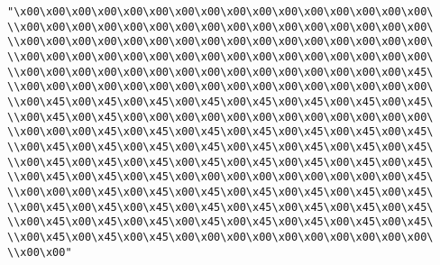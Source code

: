 \verb|"\x00\x00\x00\x00\x00\x00\x00\x00\x00\x00\x00\x00\x00\x00\x00\x00\|\newline
\verb|\\x00\x00\x00\x00\x00\x00\x00\x00\x00\x00\x00\x00\x00\x00\x00\x00\|\newline
\verb|\\x00\x00\x00\x00\x00\x00\x00\x00\x00\x00\x00\x00\x00\x00\x00\x00\|\newline
\verb|\\x00\x00\x00\x00\x00\x00\x00\x00\x00\x00\x00\x00\x00\x00\x00\x00\|\newline
\verb|\\x00\x00\x00\x00\x00\x00\x00\x00\x00\x00\x00\x00\x00\x00\x00\x45\|\newline
\verb|\\x00\x00\x00\x00\x00\x00\x00\x00\x00\x00\x00\x00\x00\x00\x00\x00\|\newline
\verb|\\x00\x45\x00\x45\x00\x45\x00\x45\x00\x45\x00\x45\x00\x45\x00\x45\|\newline
\verb|\\x00\x45\x00\x45\x00\x00\x00\x00\x00\x00\x00\x00\x00\x00\x00\x00\|\newline
\verb|\\x00\x00\x00\x45\x00\x45\x00\x45\x00\x45\x00\x45\x00\x45\x00\x45\|\newline
\verb|\\x00\x45\x00\x45\x00\x45\x00\x45\x00\x45\x00\x45\x00\x45\x00\x45\|\newline
\verb|\\x00\x45\x00\x45\x00\x45\x00\x45\x00\x45\x00\x45\x00\x45\x00\x45\|\newline
\verb|\\x00\x45\x00\x45\x00\x45\x00\x00\x00\x00\x00\x00\x00\x00\x00\x45\|\newline
\verb|\\x00\x00\x00\x45\x00\x45\x00\x45\x00\x45\x00\x45\x00\x45\x00\x45\|\newline
\verb|\\x00\x45\x00\x45\x00\x45\x00\x45\x00\x45\x00\x45\x00\x45\x00\x45\|\newline
\verb|\\x00\x45\x00\x45\x00\x45\x00\x45\x00\x45\x00\x45\x00\x45\x00\x45\|\newline
\verb|\\x00\x45\x00\x45\x00\x45\x00\x00\x00\x00\x00\x00\x00\x00\x00\x00\|\newline
\verb|\\x00\x00"|\newline

